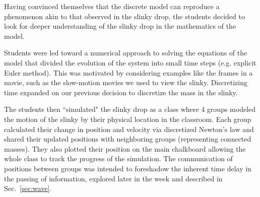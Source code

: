 \documentclass[pre,preprint,superscriptaddress,longbibliography]{revtex4-1}
\newcommand{\eq}[1]{eq.~\eqref{eq:#1}}
\newcommand{\nn}{\nonumber}
\begin{document}
Having convinced themselves that the discrete model can reproduce a phenomenon akin to that observed in the slinky drop,
the students decided to look for deeper understanding of the slinky drop in the mathematics of the model.  

Students were led toward a numerical approach to solving
the equations of the model that divided the evolution of the system into small time
steps (e.g.  explicit Euler method). This was motivated by considering examples like the frames in a movie, such as the slow-motion movies we used to view the slinky. Discretizing time expanded on our previous decision to discretize the mass in the slinky.


The students then ``simulated" the slinky drop as a class where 4 groups modeled the motion of the slinky by their physical location in the classroom. Each group calculated their change in position and velocity via discretized Newton's law and shared their updated positions with neighboring groups (representing connected masses).  %
They also plotted their position on the main chalkboard allowing the whole class to track the progress of the simulation.
The communication of positions between groups was intended 
to foreshadow the inherent time delay in the passing of information, explored later in
the week and described in Sec.~\ref{sec:wave}.
\end{document}

